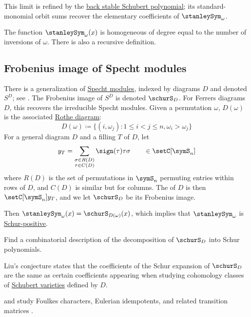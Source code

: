 This limit is refined by the
\hyperref[backStableSchubertPolynomial]{back stable Schubert polynomial}; its
standard-monomial orbit sums recover the elementary coefficients of
$\stanleySym_\omega$.

The function $\stanleySym_\omega(x)$ is homogeneous of degree equal to the
number of inversions of $\omega$.
There is also a recursive definition.



\subsection[stanleySymFrobenius]{Frobenius image of Specht modules}

There is a generalization of \hyperref[spechtModules]{Specht modules},
indexed by diagrams $D$ and denoted $S^D$; see
\cite{BilleyPawlowski2014}.  The Frobenius image of $S^D$ is denoted
$\schurS_D$.  For Ferrers diagrams $D$, this recovers the irreducible
Specht modules.  Given a permutation $\omega$, $D(\omega)$
is the associated \hyperref[rotheDiagram]{Rothe diagram}:
\begin{equation*}
D(\omega) \coloneqq \{ (i, \omega_j) : 1\leq i \lt j \leq n, \omega_i > \omega_j \}
\end{equation*}
For a general diagram $D$ and a filling $T$ of $D$, let
\[
y_T = \sum_{\substack{\sigma \in R(D) \\ \tau \in C(D)}} \sign(\tau) \tau \sigma \qquad \in \setC[\symS_n]
\]
where $R(D)$ is the set of permutations in $\symS_n$ permuting entries within
rows of $D$, and $C(D)$ is similar but for columns.
The \label{spechtModuleDefinition} of $D$ is then
$\setC[\symS_n]y_T$, and we let $\schurS_D$ be its Frobenius image.

Then $\stanleySym_{\omega}(x) = \schurS_{D(\omega)}(x)$, which implies that
$\stanleySym_{\omega}$ is \hyperref[schurPositivity]{Schur-positive}.

\begin{problem}
Find a combinatorial description of the
decomposition of $\schurS_D$ into Schur polynomials.
\end{problem}


Liu's conjecture \cite{LiuThesis} states that the coefficients of the
Schur expansion of $\schurS_D$ are the same as certain coefficients appearing
when studying cohomology classes of
\hyperref[schubertVarietiesAndMatroids]{Schubert varieties} defined by $D$.


 and  study Foulkes characters,
Eulerian idempotents, and related transition matrices \cite{DiaconisFulman2012}.


